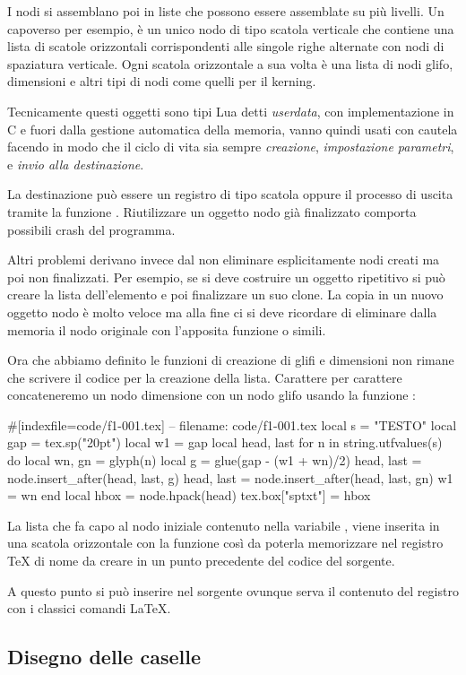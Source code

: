 I nodi si assemblano poi in liste che possono essere assemblate su più livelli.
Un capoverso per esempio, è un unico nodo di tipo scatola verticale che contiene
una lista di scatole orizzontali corrispondenti alle singole righe alternate con
nodi di spaziatura verticale. Ogni scatola orizzontale a sua volta è una lista
di nodi glifo, dimensioni e altri tipi di nodi come quelli per il kerning.

Tecnicamente questi oggetti sono tipi Lua detti \emph{userdata}, con
implementazione in C e fuori dalla gestione automatica della memoria, vanno
quindi usati con cautela facendo in modo che il ciclo di vita sia sempre
\emph{creazione}, \emph{impostazione parametri}, e \emph{invio alla
destinazione}.

La destinazione può essere un registro di tipo scatola oppure il processo di
uscita tramite la funzione . Riutilizzare un oggetto nodo già
finalizzato comporta possibili crash del programma.

Altri problemi derivano invece dal non eliminare esplicitamente nodi creati ma
poi non finalizzati. Per esempio, se si deve costruire un oggetto ripetitivo si
può creare la lista dell'elemento e poi finalizzare un suo clone. La copia in un
nuovo oggetto nodo è molto veloce ma alla fine ci si deve ricordare di eliminare
dalla memoria il nodo originale con l'apposita funzione
 o simili.

Ora che abbiamo definito le funzioni di creazione di glifi e dimensioni non
rimane che scrivere il codice per la creazione della lista. Carattere per
carattere concateneremo un nodo dimensione con un nodo glifo usando la funzione
:
\begin{lines}
#[indexfile=code/f1-001.tex]
-- filename: code/f1-001.tex
local s = "TESTO"
local gap = tex.sp("20pt")
local w1 = gap
local head, last
for n in string.utfvalues(s) do
    local wn, gn = glyph(n)
    local g = glue(gap - (w1 + wn)/2)
    head, last = node.insert_after(head, last, g)
    head, last = node.insert_after(head, last, gn)
    w1 = wn
end
local hbox = node.hpack(head)
tex.box["sptxt"] = hbox
\end{lines}

La lista che fa capo al nodo iniziale contenuto nella variabile ,
viene inserita in una scatola orizzontale con la funzione
 così da poterla memorizzare nel registro
\TeX{} di nome  da creare in un punto precedente del codice del
sorgente.

A questo punto si può inserire nel sorgente ovunque serva il contenuto del
registro con i classici comandi \LaTeX.


\subsection{Disegno delle caselle}





